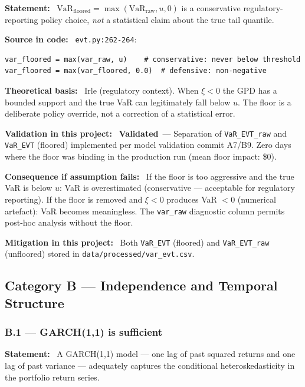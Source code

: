 \documentclass[11pt,a4paper]{article}
\newcommand{\asmfield}[1]{\medskip\noindent\textbf{#1:}\ }
\newcommand{\code}[1]{\texttt{#1}}
\newcommand{\validated}{\textbf{Validated}}
\begin{document}
\asmfield{Statement}
$\text{VaR}_{\text{floored}} = \max(\text{VaR}_{\text{raw}}, u, 0)$ is a
conservative regulatory-reporting policy choice, \emph{not} a statistical
claim about the true tail quantile.

\asmfield{Source in code}
\code{evt.py:262-264}:
\begin{lstlisting}
var_floored = max(var_raw, u)    # conservative: never below threshold
var_floored = max(var_floored, 0.0)  # defensive: non-negative
\end{lstlisting}

\asmfield{Theoretical basis}
Irle (regulatory context). When $\xi < 0$ the GPD has a bounded support
and the true VaR can legitimately fall below $u$. The floor is a
deliberate policy override, not a correction of a statistical error.

\asmfield{Validation in this project}
\validated\ --- Separation of \code{VaR\_EVT\_raw} and \code{VaR\_EVT}
(floored) implemented per model validation commit A7/B9. Zero days where
the floor was binding in the production run (mean floor impact: \$0).

\asmfield{Consequence if assumption fails}
If the floor is too aggressive and the true VaR is below $u$: VaR is
overestimated (conservative --- acceptable for regulatory reporting). If
the floor is removed and $\xi < 0$ produces VaR $< 0$ (numerical artefact):
VaR becomes meaningless. The \code{var\_raw} diagnostic column permits
post-hoc analysis without the floor.

\asmfield{Mitigation in this project}
Both \code{VaR\_EVT} (floored) and \code{VaR\_EVT\_raw} (unfloored)
stored in \code{data/processed/var\_evt.csv}.

\subsection{Category B --- Independence and Temporal Structure}\label{sec:catB}

\subsubsection{B.1 --- GARCH(1,1) is sufficient}\label{asm:B1}

\asmfield{Statement}
A GARCH(1,1) model --- one lag of past squared returns and one lag of
past variance --- adequately captures the conditional heteroskedasticity
in the portfolio return series.
\end{document}
